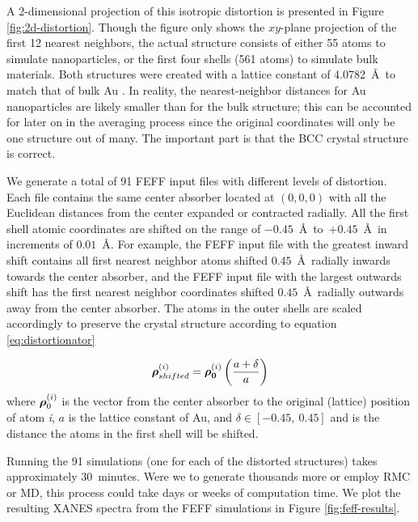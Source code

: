A 2-dimensional projection of this isotropic distortion is presented in Figure \ref{fig:2d-distortion}. Though the figure only shows the $xy$\nobreakdash-plane projection of the first 12 nearest neighbors, the actual structure consists of either 55 atoms to simulate nanoparticles, or the first four shells (561 atoms) to simulate bulk materials. Both structures were created with a lattice constant of 4.0782~\AA~to match that of bulk Au \cite{gold-a-value-data}. In reality, the nearest-neighbor distances for Au nanoparticles are likely smaller than for the bulk structure; this can be accounted for later on in the averaging process since the original coordinates will only be one structure out of many. The important part is that the BCC crystal structure is correct. 

We generate a total of 91 FEFF input files with different levels of distortion. Each file contains the same center absorber located at $(0,0,0)$ with all the Euclidean distances from the center expanded or contracted radially. All the first shell atomic coordinates are shifted on the range of $ -0.45 $~\AA~to~$ +0.45 $~\AA~in increments of $ 0.01 $~\AA. For example, the FEFF input file with the greatest inward shift contains all first nearest neighbor atoms shifted $ 0.45 $~\AA~radially inwards towards the center absorber, and the FEFF input file with the largest outwards shift has the first nearest neighbor coordinates shifted $ 0.45 $~\AA~radially outwards away from the center absorber. The atoms in the outer shells are scaled accordingly to preserve the crystal structure according to equation \ref{eq:distortionator}

\begin{equation}
	\label{eq:distortionator}
	\vb*{\rho}_{shifted}^{(i)} = \vb*{\rho_0}^{(i)} \left( \dfrac{a + \delta}{a} \right)
\end{equation}
where $ \vb*{\rho}_0^{(i)} $ is the vector from the center absorber to the original (lattice) position of atom \textit{i}, $ a $ is the lattice constant of Au, and $ \delta \in [-0.45,~0.45] $ and is the distance the atoms in the first shell will be shifted.   


Running the 91 simulations (one for each of the distorted structures) takes approximately 30~minutes. Were we to generate thousands more or employ RMC or MD, this process could take days or weeks of computation time. We plot the resulting XANES spectra from the FEFF simulations in Figure \ref{fig:feff-results}.

